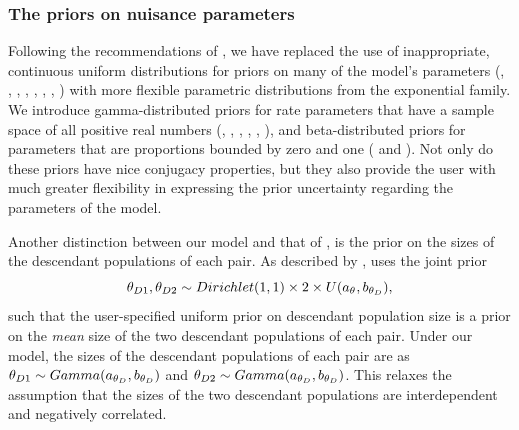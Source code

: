 \documentclass[letterpaper,12pt]{article}
\begin{document}
\begin{linenumbers}
\subsubsection*{The priors on nuisance parameters}
Following the recommendations of \citet{Oaks2012}, we have replaced the use of
inappropriate, continuous uniform distributions for priors on many of the
model's parameters (\divTime{}, \ancestralTheta{}, ,
, , ,
\recombinationRate, \migrationRate{}) with more flexible parametric
distributions from the exponential family.
We introduce gamma-distributed priors for rate parameters that have a sample
space of all positive real numbers (\divTime{}, \ancestralTheta{},
, , \recombinationRate,
\migrationRate{}), and beta-distributed priors for parameters that are
proportions bounded by zero and one ( and
).
Not only do these priors have nice conjugacy properties, but they also provide
the user with much greater flexibility in expressing the prior uncertainty
regarding the parameters of the model.

Another distinction between our model and that of \msb, is the prior on the
sizes of the descendant populations of each pair.
As described by \citet{Oaks2012}, \msb uses the joint prior
\begin{equation}
    \descendantTheta{1}{}, \descendantTheta{2}{} \sim
    Dirichlet(1,1) \times 2 \times U(\uniformMin{\myTheta{}},
    \uniformMax{\descendantTheta{}{}}),
    \label{eq:jointThetaPrior}
\end{equation}
such that the user-specified uniform prior on descendant population
size is a prior on the \emph{mean} size of the two descendant
populations of each pair.
Under our model, the sizes of the descendant populations of each
pair are \iid as
$\descendantTheta{1}{} \sim Gamma(\gammaShape{\descendantTheta{}{}},
\gammaScale{\descendantTheta{}{}})$
and
$\descendantTheta{2}{} \sim Gamma(\gammaShape{\descendantTheta{}{}},
\gammaScale{\descendantTheta{}{}})$.
This relaxes the assumption that the sizes of the two descendant populations
are interdependent and negatively correlated.


\end{linenumbers}
\end{document}
